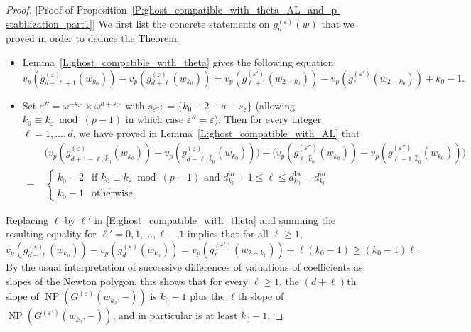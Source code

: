 \begin{proof}
    [Proof of Proposition~\ref{P:ghost_compatible_with_theta_AL_and_p-stabilization_part1}]
    We first list the concrete statements on $g_n^{(\varepsilon)}(w)$ that we proved in order to deduce the Theorem:
    \begin{itemize}
    \item[(a)] Lemma~\ref{L:ghost_compatible_with_theta} gives the following equation:
    \begin{equation}
    \label{E:ghost_compatible_with_theta}
    v_p(g^{(\varepsilon)}_{d+\ell+1}(w_{k_0}))-v_p(g^{(\varepsilon)}_{d+\ell}(w_{k_0})) = v_p(g^{(\varepsilon')}_{\ell+1}(w_{2-{k_0}}))-v_p(g^{(\varepsilon')}_{\ell}(w_{2-{k_0}})) +{k_0}-1.
    \end{equation}
    \item[(b)]
    Set $\varepsilon'' = \omega^{-s_{\varepsilon''}} \times \omega^{a+s_{\varepsilon''}}$ with $s_{\varepsilon''}: = \{{k_0}-  2-a-s_\varepsilon\}$ (allowing $k_0\equiv k_\varepsilon \bmod{(p-1)}$ in which case $\varepsilon''= \varepsilon$).
    Then for every integer $\ell =1, \dots, d$, we have proved in Lemma~\ref{L:ghost_compatible_with_AL} that
    \begin{align}
    \label{E:ghost_compatible_with_AL}
    &\big(v_p(g^{(\varepsilon)}_{d+1-\ell, \hat k_0}(w_{k_0})) - v_p(g^{(\varepsilon)}_{d-\ell, \hat k_0}(w_{k_0})) \big) + \big(v_p(g^{(\varepsilon'')}_{\ell, \hat k_0}(w_{k_0})) - v_p(g^{(\varepsilon'')}_{\ell-1, \hat k_0}(w_{k_0})) \big)
    \\
    \nonumber
    =\ & \begin{cases}
    {k_0}-2 & \textrm{if }k_0\equiv k_\varepsilon \bmod{(p-1)} \textrm{ and }d_{k_0}^{\mathrm{ur}}+1\leq  \ell \leq d_{k_0}^{\mathrm{Iw}}-d_{k_0}^{\mathrm{ur}}\\
    {k_0}-1 & \textrm{otherwise.}
    \end{cases}
    \end{align}
    \end{itemize}
    Replacing  $\ell$ by $\ell'$ in \eqref{E:ghost_compatible_with_theta} and summing the resulting equality for $\ell' =0, 1, \dots, \ell-1$ implies that for all $\ell \geq 1$,
    $$
    v_p(g^{(\varepsilon)}_{d+\ell}(w_{k_0}))-v_p(g^{(\varepsilon)}_{d}(w_{k_0})) = v_p(g^{(\varepsilon')}_{\ell}(w_{2-{k_0}}))  +\ell({k_0}-1) \geq (k_0-1)\ell.
    $$
    By the usual interpretation of successive differences of valuations of coefficients as slopes of the Newton polygon, this shows that for every $\ell\geq 1$, the $(d+\ell)$th slope of ${\operatorname{NP}}(G^{(\varepsilon)}(w_{k_0}, -))$ is $k_0-1$ plus the $\ell$th slope of ${\operatorname{NP}}(G^{(\varepsilon')}(w_{k_0}, -))$, and in particular is at least $k_0-1$.
\end{proof}

